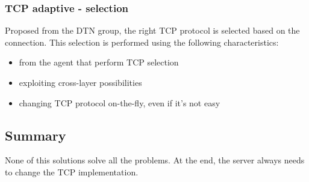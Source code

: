\subsubsection{TCP adaptive - selection}
Proposed from the DTN group, the right TCP protocol is selected based on the
connection. This selection is performed using the following characteristics:
\begin{itemize}
\item from the agent that perform TCP selection
\item exploiting cross-layer possibilities
\item changing TCP protocol on-the-fly, even if it's not easy
\end{itemize}

\subsection{Summary}
None of this solutions solve all the problems. At the end, the server always
needs to change the TCP implementation.
